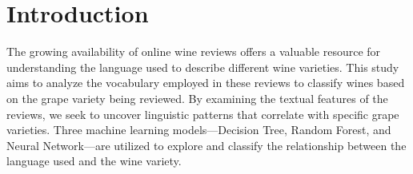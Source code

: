\section{Introduction} 
The growing availability of online wine reviews offers a valuable resource for understanding the language used to describe different wine varieties. This study aims to analyze the vocabulary employed in these reviews to classify wines based on the grape variety being reviewed. By examining the textual features of the reviews, we seek to uncover linguistic patterns that correlate with specific grape varieties. Three machine learning models—Decision Tree, Random Forest, and Neural Network—are utilized to explore and classify the relationship between the language used and the wine variety.